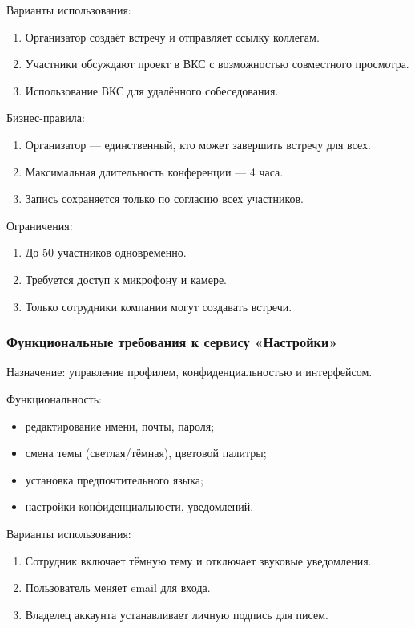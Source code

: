 Варианты использования:
\begin{enumerate}
  \item Организатор создаёт встречу и отправляет ссылку коллегам.
  \item Участники обсуждают проект в ВКС с возможностью совместного просмотра.
  \item Использование ВКС для удалённого собеседования.
\end{enumerate}

Бизнес-правила:
\begin{enumerate}
  \item Организатор — единственный, кто может завершить встречу для всех.
  \item Максимальная длительность конференции — 4 часа.
  \item Запись сохраняется только по согласию всех участников.
\end{enumerate}

Ограничения:
\begin{enumerate}
  \item До 50 участников одновременно.
  \item Требуется доступ к микрофону и камере.
  \item Только сотрудники компании могут создавать встречи.
\end{enumerate}

\subsubsection{Функциональные требования к сервису «Настройки»}

Назначение: управление профилем, конфиденциальностью и интерфейсом.

Функциональность:
\begin{itemize}
  \item редактирование имени, почты, пароля;
  \item смена темы (светлая/тёмная), цветовой палитры;
  \item установка предпочтительного языка;
  \item настройки конфиденциальности, уведомлений.
\end{itemize}

Варианты использования:
\begin{enumerate}
  \item Сотрудник включает тёмную тему и отключает звуковые уведомления.
  \item Пользователь меняет email для входа.
  \item Владелец аккаунта устанавливает личную подпись для писем.
\end{enumerate}

